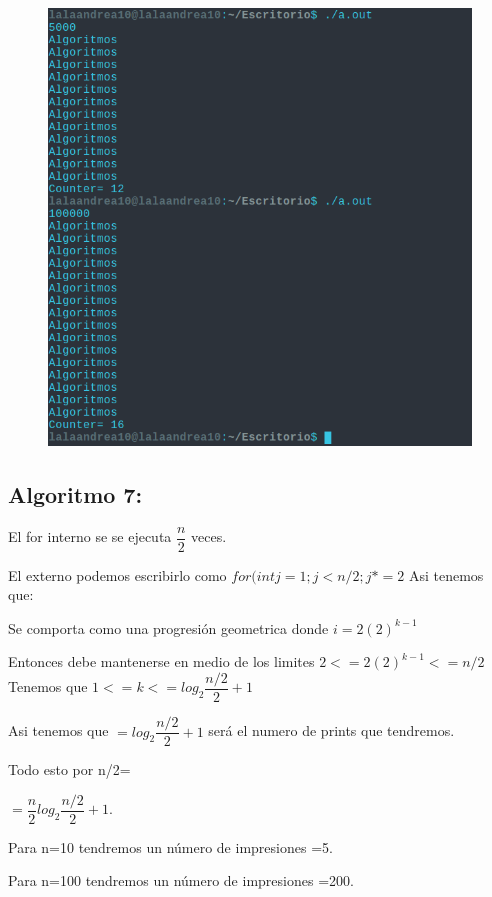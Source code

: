 \documentclass[12pt, fleqn]{article}                             %
\theoremstyle{break}                                            %
\begin{document}
    \begin{figure}[H]
               \centering
                \includegraphics[scale=.5]{5000.png}
            \end{figure}

    \subsection{Algoritmo 7:}
    
    El for interno se se ejecuta  $\dfrac{n}{2}$ veces.

    El externo podemos escribirlo como $for(int j=1; j<n/2; j*=2$
    Asi tenemos que:

    Se comporta como una progresión geometrica donde $i=2(2)^{k-1}$

    Entonces debe mantenerse en medio de los limites $2<=2(2)^{k-1}<=n/2$ Tenemos que $1<=k<=log_{2}\dfrac{n/2}{2}+1$

    Asi tenemos que $= log_{2}\dfrac{n/2}{2} +1$ será el numero de prints que tendremos.

    Todo esto por n/2=

    $= \dfrac{n}{2}log_{2}\dfrac{n/2}{2} +1.$

    Para n=10 tendremos un número de impresiones =5.

    Para n=100 tendremos un número de impresiones =200.
\end{document}
